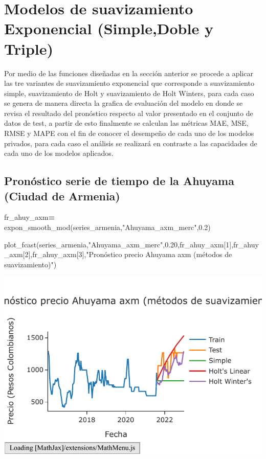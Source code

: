 \documentclass[
]{book}
\newenvironment{Shaded}{\begin{snugshade}}{\end{snugshade}}
\newcommand{\DecValTok}[1]{\textcolor[rgb]{0.00,0.00,0.81}{#1}}
\newcommand{\FloatTok}[1]{\textcolor[rgb]{0.00,0.00,0.81}{#1}}
\newcommand{\NormalTok}[1]{#1}
\newcommand{\OperatorTok}[1]{\textcolor[rgb]{0.81,0.36,0.00}{\textbf{#1}}}
\newcommand{\StringTok}[1]{\textcolor[rgb]{0.31,0.60,0.02}{#1}}
\begin{document}
\hypertarget{modelos-de-suavizamiento-exponencial-simpledoble-y-triple}{%
\section{Modelos de suavizamiento Exponencial (Simple,Doble y Triple)}\label{modelos-de-suavizamiento-exponencial-simpledoble-y-triple}}

Por medio de las funciones diseñadas en la sección anterior se procede a aplicar las tre variantes de suavizamiento exponencial que corresponde a suavizamiento simple, suavizamiento de Holt y suavizamiento de Holt Winters, para cada caso se genera de manera directa la grafica de evaluación del modelo en donde se revisa el resultado del pronóstico respecto al valor presentado en el conjunto de datos de test, a partir de esto finalmente se calculan las métricas MAE, MSE, RMSE y MAPE con el fin de conocer el desempeño de cada uno de los modelos privados, para cada caso el análisis se realizará en contraste a las capacidades de cada uno de los modelos aplicados.

\hypertarget{pronuxf3stico-serie-de-tiempo-de-la-ahuyama-ciudad-de-armenia}{%
\subsection{Pronóstico serie de tiempo de la Ahuyama (Ciudad de Armenia)}\label{pronuxf3stico-serie-de-tiempo-de-la-ahuyama-ciudad-de-armenia}}

\begin{Shaded}
\begin{Highlighting}[]

\NormalTok{fr\_ahuy\_axm}\OperatorTok{=}\NormalTok{ expon\_smooth\_mod(series\_armenia,}\StringTok{"Ahuyama\_axm\_merc"}\NormalTok{,}\FloatTok{0.2}\NormalTok{)}

\NormalTok{plot\_fcast(series\_armenia,}\StringTok{"Ahuyama\_axm\_merc"}\NormalTok{,}\FloatTok{0.20}\NormalTok{,fr\_ahuy\_axm[}\DecValTok{1}\NormalTok{],fr\_ahuy\_axm[}\DecValTok{2}\NormalTok{],fr\_ahuy\_axm[}\DecValTok{3}\NormalTok{],}\StringTok{"Pronóstico precio Ahuyama axm (métodos de suavizamiento)"}\NormalTok{)}
\end{Highlighting}
\end{Shaded}

\includegraphics{bookdown-demo_files/figure-latex/unnamed-chunk-132-119.pdf}
\end{document}
